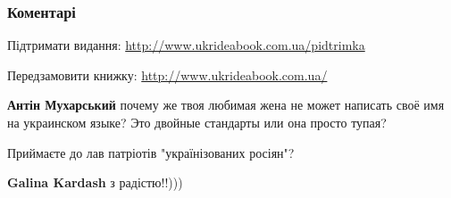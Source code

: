  
 
 
 
 
\subsubsection{Коментарі}

\begin{itemize}
 
Підтримати видання: \url{http://www.ukrideabook.com.ua/pidtrimka} 

Передзамовити книжку: \url{http://www.ukrideabook.com.ua/}

\begin{itemize}
 
\textbf{Антін Мухарський} 
почему же твоя любимая жена не может написать своё имя на украинском языке? Это
двойные стандарты или она просто тупая?
\end{itemize}

 
Приймаєте до лав патріотів "українізованих росіян"?

\begin{itemize}
 
\textbf{Galina Kardash} з радістю!!)))
\end{itemize}


\end{itemize}
